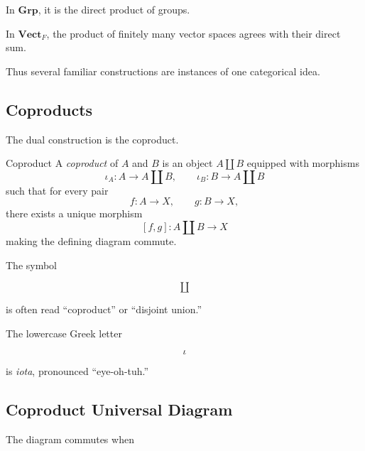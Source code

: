 In \(\mathbf{Grp}\), it is the direct product of groups.

In \(\mathbf{Vect}_F\), the product of finitely many vector spaces agrees
with their direct sum.

Thus several familiar constructions are instances of one categorical idea.

\subsection{Coproducts}
\label{subsec:categorical-coproducts}

The dual construction is the coproduct.

\begin{definitionbox}{Coproduct}
A \emph{coproduct} of \(A\) and \(B\) is an object \(A\amalg B\) equipped
with morphisms
\[ \iota_A:A\to A\amalg B,\qquad
\iota_B:B\to A\amalg B \]
such that for every pair
\[ f:A\to X,\qquad g:B\to X, \]
there exists a unique morphism
\[ [f,g]:A\amalg B\to X \]
making the defining diagram commute.
\end{definitionbox}

The symbol

\[ \amalg \]

is often read ``coproduct'' or ``disjoint union.''

The lowercase Greek letter

\[ \iota \]

is \emph{iota}, pronounced ``eye-oh-tuh.''

\subsection{Coproduct Universal Diagram}
\label{subsec:coproduct-universal-diagram}

\begin{centereddiagram}
\end{centereddiagram}

The diagram commutes when

